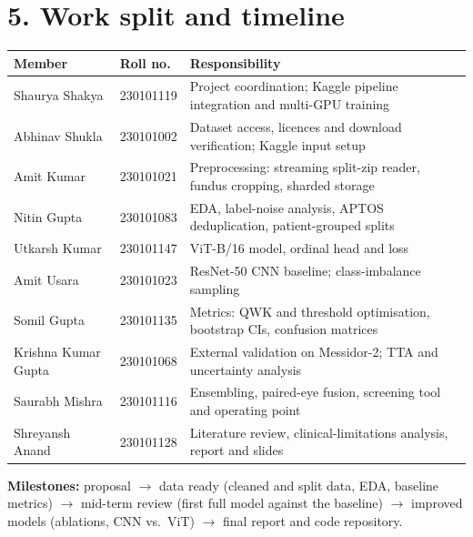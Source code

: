 \documentclass[10pt]{article}
\begin{document}
\section*{5. Work split and timeline}
\begin{center}\footnotesize
\begin{tabularx}{\linewidth}{@{}l l X@{}}
\toprule
Member & Roll no. & Responsibility\\
\midrule
Shaurya Shakya & 230101119 & Project coordination; Kaggle pipeline integration and multi-GPU training\\
Abhinav Shukla & 230101002 & Dataset access, licences and download verification; Kaggle input setup\\
Amit Kumar & 230101021 & Preprocessing: streaming split-zip reader, fundus cropping, sharded storage\\
Nitin Gupta & 230101083 & EDA, label-noise analysis, APTOS deduplication, patient-grouped splits\\
Utkarsh Kumar & 230101147 & ViT-B/16 model, ordinal head and loss\\
Amit Usara & 230101023 & ResNet-50 CNN baseline; class-imbalance sampling\\
Somil Gupta & 230101135 & Metrics: QWK and threshold optimisation, bootstrap CIs, confusion matrices\\
Krishna Kumar Gupta & 230101068 & External validation on Messidor-2; TTA and uncertainty analysis\\
Saurabh Mishra & 230101116 & Ensembling, paired-eye fusion, screening tool and operating point\\
Shreyansh Anand & 230101128 & Literature review, clinical-limitations analysis, report and slides\\
\bottomrule
\end{tabularx}
\end{center}
\textbf{Milestones:} proposal $\rightarrow$ data ready (cleaned and split data, EDA, baseline metrics) $\rightarrow$ mid-term review (first full model against the baseline) $\rightarrow$ improved models (ablations, CNN vs.\ ViT) $\rightarrow$ final report and code repository.
\end{document}
